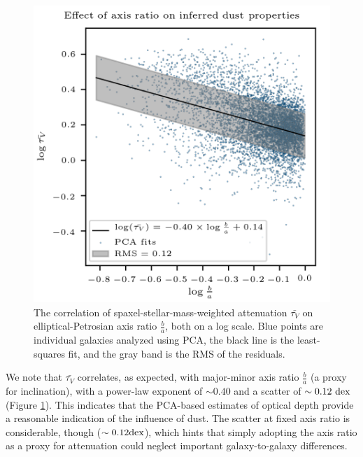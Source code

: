 \begin{figure}
    \centering
    \includegraphics[width=\columnwidth]{meantauV_ba}
    \caption[The relationship between mass deficit and axis ratio]{\fixspacing The correlation of spaxel-stellar-mass-weighted attenuation $\bar{\tau_V}$ on elliptical-Petrosian axis ratio $\frac{b}{a}$, both on a log scale. Blue points are individual galaxies analyzed using PCA, the black line is the least-squares fit, and the gray band is the RMS of the residuals.}
    \label{fig:meantauV_ba}
\end{figure}

We note that $\bar{\tau_V}$ correlates, as expected, with major-minor axis ratio $\frac{b}{a}$ (a proxy for inclination), with a power-law exponent of $\sim 0.40$ and a scatter of $\sim 0.12 ~ {\rm dex}$ (Figure \ref{fig:meantauV_ba}). This indicates that the PCA-based estimates of optical depth provide a reasonable indication of the influence of dust. The scatter at fixed axis ratio is considerable, though ($\sim 0.12 {\rm dex}$), which hints that simply adopting the axis ratio as a proxy for attenuation could neglect important galaxy-to-galaxy differences.

